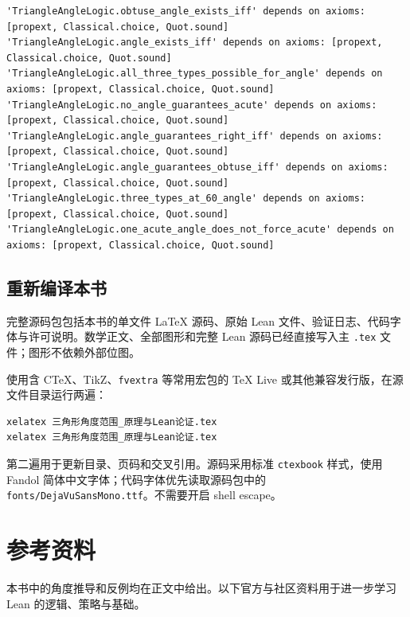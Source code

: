 \documentclass[UTF8,a4paper,zihao=-4,oneside,openany,fontset=fandol]{ctexbook}
\theoremstyle{definition}
\theoremstyle{remark}
\begin{document}
\begin{Verbatim}[fontsize=\fontsize{8.5}{11}\selectfont]
'TriangleAngleLogic.obtuse_angle_exists_iff' depends on axioms: [propext, Classical.choice, Quot.sound]
'TriangleAngleLogic.angle_exists_iff' depends on axioms: [propext, Classical.choice, Quot.sound]
'TriangleAngleLogic.all_three_types_possible_for_angle' depends on axioms: [propext, Classical.choice, Quot.sound]
'TriangleAngleLogic.no_angle_guarantees_acute' depends on axioms: [propext, Classical.choice, Quot.sound]
'TriangleAngleLogic.angle_guarantees_right_iff' depends on axioms: [propext, Classical.choice, Quot.sound]
'TriangleAngleLogic.angle_guarantees_obtuse_iff' depends on axioms: [propext, Classical.choice, Quot.sound]
'TriangleAngleLogic.three_types_at_60_angle' depends on axioms: [propext, Classical.choice, Quot.sound]
'TriangleAngleLogic.one_acute_angle_does_not_force_acute' depends on axioms: [propext, Classical.choice, Quot.sound]

\end{Verbatim}

\section{重新编译本书}

完整源码包包括本书的单文件 LaTeX 源码、原始 Lean 文件、验证日志、代码字体与许可说明。数学正文、全部图形和完整 Lean 源码已经直接写入主 \texttt{.tex} 文件；图形不依赖外部位图。

使用含 CTeX、TikZ、\texttt{fvextra} 等常用宏包的 TeX Live 或其他兼容发行版，在源文件目录运行两遍：
\begin{Verbatim}
xelatex 三角形角度范围_原理与Lean论证.tex
xelatex 三角形角度范围_原理与Lean论证.tex
\end{Verbatim}
第二遍用于更新目录、页码和交叉引用。源码采用标准 \texttt{ctexbook} 样式，使用 Fandol 简体中文字体；代码字体优先读取源码包中的 \texttt{fonts/DejaVuSansMono.ttf}。不需要开启 shell escape。

\backmatter
\chapter{参考资料}

本书中的角度推导和反例均在正文中给出。以下官方与社区资料用于进一步学习 Lean 的逻辑、策略与基础。
\end{document}
